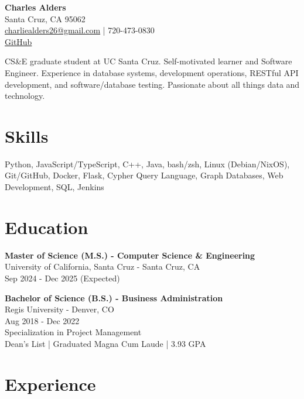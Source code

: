 \documentclass[a4paper,10pt]{article}
\begin{document}
\begin{center}
  {\LARGE \textbf{Charles Alders}} \\
  Santa Cruz, CA 95062 \\
  \href{mailto:charliealders26@gmail.com}{charliealders26@gmail.com} | 720-473-0830 \\
  \href{https://github.com/char26}{GitHub}
\end{center}

\vspace{0.5cm}

\begin{flushleft}
  CS\&E graduate student at UC Santa Cruz. Self-motivated learner and Software Engineer. Experience in database systems, development operations, RESTful API development, and software/database testing. Passionate about all things data and technology.
\end{flushleft}

\section*{Skills}
Python, JavaScript/TypeScript, C++, Java, bash/zsh, Linux (Debian/NixOS), Git/GitHub, Docker, Flask, Cypher Query Language, Graph Databases, Web Development, SQL, Jenkins

\section*{Education}
\begin{flushleft}
  \textbf{Master of Science (M.S.) - Computer Science \& Engineering} \\
  University of California, Santa Cruz - Santa Cruz, CA \\
  Sep 2024 - Dec 2025 (Expected)
\end{flushleft}

\begin{flushleft}
  \textbf{Bachelor of Science (B.S.) - Business Administration} \\
  Regis University - Denver, CO \\
  Aug 2018 - Dec 2022 \\
  Specialization in Project Management \\
  Dean's List | Graduated Magna Cum Laude | 3.93 GPA
\end{flushleft}
\section*{Experience}
\end{document}
